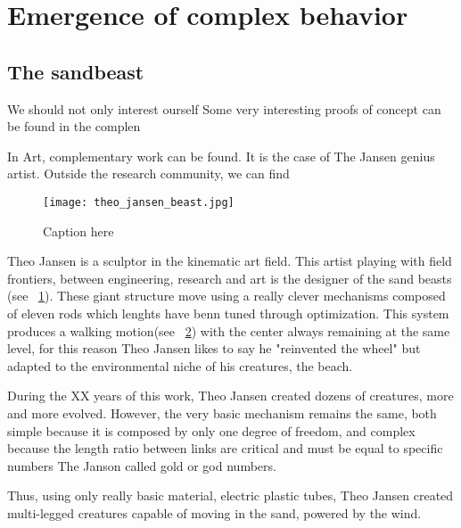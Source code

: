 \section{Emergence of complex behavior} %

\subsection{The sandbeast} %

We should not only interest ourself
Some very interesting proofs of concept can be found in the complen

In Art, complementary work can be found. It is the case of The Jansen genius artist. Outside the research community, we can find


\begin{figure}[]
    \begin{center}
        \texttt{[image: theo\_jansen\_beast.jpg]}
    \end{center}
    \caption{Caption here}
    \label{fig:theo_jansen_beast}
\end{figure}

Theo Jansen is a sculptor in the kinematic art field. This artist playing with field frontiers, between engineering, research and art is the designer of the sand beasts (see \figurename~\ref{fig:theo_jansen_beast}).
These giant structure move using a really clever mechanisms composed of eleven rods which lenghts have benn tuned through optimization. This system produces a walking motion(see \figurename~\ref{fig:beast_mechanism}) with the center always remaining at the same level, for this reason Theo Jansen likes to say he "reinvented the wheel" but adapted to the environmental niche of his creatures, the beach.

During the XX years of this work, Theo Jansen created dozens of creatures, more and more evolved. However, the very basic mechanism remains the same, both simple because it is composed by only one degree of freedom, and complex because the length ratio between links are critical and must be equal to specific numbers The Janson called gold or god numbers.

Thus, using only really basic material, electric plastic tubes, Theo Jansen created multi-legged creatures capable of moving in the sand, powered by the wind.


\begin{figure}[]
\centering
    \hfil
    \hfil
    \caption{}
    \label{fig:beast_mechanism}
\end{figure}



